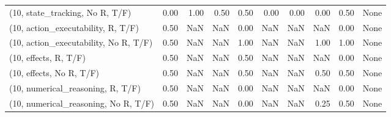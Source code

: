 \begin{table*}[h!]
\begin{adjustbox}{width=2\columnwidth,center}
\begin{tabular}{lrrr|rrr|rrr}
(10, state\_tracking, No R, T/F)       &                      0.00 &                  1.00 &                      0.50 &                          0.50 &                      0.00 &                          0.00 &                                   0.00 &                               0.50 &                                  None \\
(10, action\_executability, R, T/F)    &                      0.50 &                   NaN &                       NaN &                          0.00 &                       NaN &                           NaN &                                    NaN &                               0.00 &                                  None \\
(10, action\_executability, No R, T/F) &                      0.50 &                   NaN &                       NaN &                          1.00 &                       NaN &                           NaN &                                   1.00 &                               1.00 &                                  None \\
(10, effects, R, T/F)                 &                      0.50 &                   NaN &                       NaN &                          0.50 &                       NaN &                           NaN &                                    NaN &                               0.00 &                                  None \\
(10, effects, No R, T/F)              &                      0.50 &                   NaN &                       NaN &                          0.50 &                       NaN &                           NaN &                                   0.50 &                               0.50 &                                  None \\
(10, numerical\_reasoning, R, T/F)     &                      0.50 &                   NaN &                       NaN &                          0.00 &                       NaN &                           NaN &                                    NaN &                               0.00 &                                  None \\
(10, numerical\_reasoning, No R, T/F)  &                      0.50 &                   NaN &                       NaN &                          0.00 &                       NaN &                           NaN &                                   0.25 &                               0.50 &                                  None \\

\end{tabular}
\end{adjustbox}
\end{table*}
